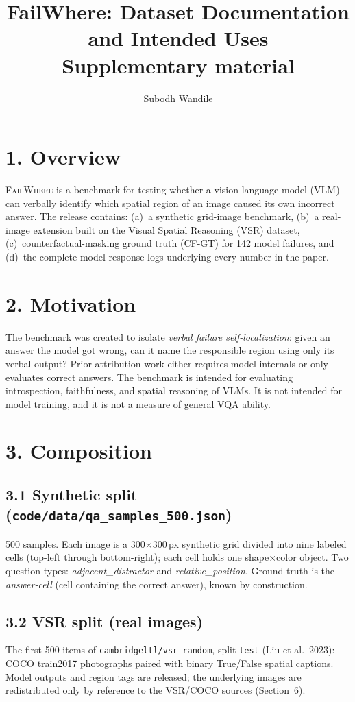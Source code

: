 \documentclass[11pt]{article}
\title{FailWhere: Dataset Documentation and Intended Uses\\
\large Supplementary material}
\author{Subodh Wandile}
\date{}
\begin{document}
\maketitle

\section*{1. Overview}
\textsc{FailWhere} is a benchmark for testing whether a vision-language
model (VLM) can verbally identify which spatial region of an image caused
its own incorrect answer. The release contains: (a)~a synthetic
grid-image benchmark, (b)~a real-image extension built on the Visual
Spatial Reasoning (VSR) dataset, (c)~counterfactual-masking ground truth
(CF-GT) for 142 model failures, and (d)~the complete model response logs
underlying every number in the paper.

\section*{2. Motivation}
The benchmark was created to isolate \emph{verbal failure
self-localization}: given an answer the model got wrong, can it name the
responsible region using only its verbal output? Prior attribution work
either requires model internals or only evaluates correct answers. The
benchmark is intended for evaluating introspection, faithfulness, and
spatial reasoning of VLMs. It is not intended for model training, and it
is not a measure of general VQA ability.

\section*{3. Composition}

\subsection*{3.1 Synthetic split (\texttt{code/data/qa\_samples\_500.json})}
500 samples. Each image is a 300$\times$300\,px synthetic grid divided
into nine labeled cells (top-left through bottom-right); each cell holds
one shape$\times$color object. Two question types:
\emph{adjacent\_distractor} and \emph{relative\_position}. Ground truth is
the \emph{answer-cell} (cell containing the correct answer), known by
construction.

\subsection*{3.2 VSR split (real images)}
The first 500 items of \texttt{cambridgeltl/vsr\_random}, split
\texttt{test} (Liu et al.\ 2023): COCO train2017 photographs paired with
binary True/False spatial captions. Model outputs and region tags are
released; the underlying images are redistributed only by reference to
the VSR/COCO sources (Section~6).
\end{document}
